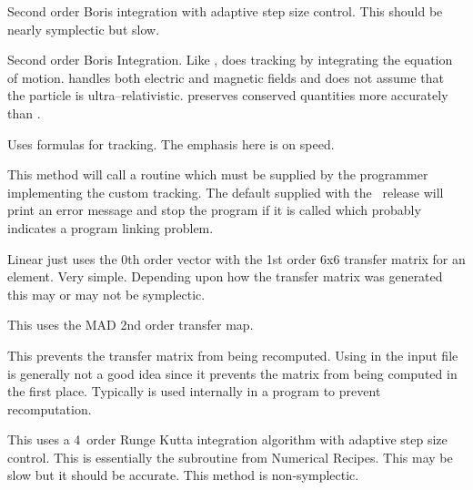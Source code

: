\begin{description}
\item[\vn{Adaptive\_Boris}]
Second order Boris integration\cite{b:boris} with adaptive step size control.
This should be nearly symplectic but slow.

\item[\vn{Boris}]
Second order Boris Integration\cite{b:boris}. Like ,
 does tracking by integrating the equation of
motion.  handles both electric and magnetic fields and does
not assume that the particle is ultra--relativistic.  preserves
conserved quantities more accurately than .

\item[\vn{Bmad\_Standard}]
Uses formulas for tracking. The emphasis here is on speed.

\item[\vn{Custom}]
This method will call a routine  which must be
supplied by the programmer implementing the custom tracking. The
default  supplied with the \bmad\ release will print
an error message and stop the program if it is called which probably
indicates a program linking problem.

\item[\vn{Linear}]
Linear just uses the 0th order vector with the 1st order 6x6 transfer
matrix for an element. Very simple.  Depending upon how the transfer
matrix was generated this may or may not be symplectic.

\item[\vn{MAD}]
This uses the MAD 2nd order transfer map.

\item[\vn{None}]
This prevents the transfer matrix from being recomputed.
Using  in the input file is generally not a good idea since
it prevents the matrix from being computed in the first place.
Typically  is used internally in a program to prevent recomputation.

\item[\vn{Runge\_Kutta}]
This uses a 4\Th\ order Runge Kutta integration algorithm with adaptive
step size control.  This is essentially the  subroutine
from Numerical Recipes\cite{b:nr}. This may be slow but it should be
accurate. This method is non-symplectic.


\end{description}
